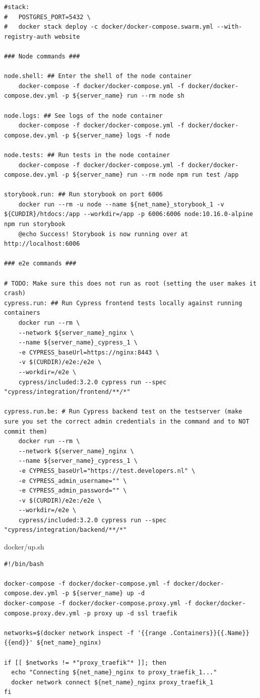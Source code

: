 \begin{verbatim}
#stack:
#	POSTGRES_PORT=5432 \
#	docker stack deploy -c docker/docker-compose.swarm.yml --with-registry-auth website

### Node commands ###

node.shell: ## Enter the shell of the node container
	docker-compose -f docker/docker-compose.yml -f docker/docker-compose.dev.yml -p ${server_name} run --rm node sh

node.logs: ## See logs of the node container
	docker-compose -f docker/docker-compose.yml -f docker/docker-compose.dev.yml -p ${server_name} logs -f node

node.tests: ## Run tests in the node container
	docker-compose -f docker/docker-compose.yml -f docker/docker-compose.dev.yml -p ${server_name} run --rm node npm run test /app

storybook.run: ## Run storybook on port 6006
	docker run --rm -u node --name ${net_name}_storybook_1 -v ${CURDIR}/htdocs:/app --workdir=/app -p 6006:6006 node:10.16.0-alpine npm run storybook
	@echo Success! Storybook is now running over at http://localhost:6006

### e2e commands ###

# TODO: Make sure this does not run as root (setting the user makes it crash)
cypress.run: ## Run Cypress frontend tests locally against running containers
	docker run --rm \
	--network ${server_name}_nginx \
	--name ${server_name}_cypress_1 \
	-e CYPRESS_baseUrl=https://nginx:8443 \
	-v $(CURDIR)/e2e:/e2e \
	--workdir=/e2e \
	cypress/included:3.2.0 cypress run --spec "cypress/integration/frontend/**/*"

cypress.run.be: # Run Cypress backend test on the testserver (make sure you set the correct admin credentials in the command and to NOT commit them)
	docker run --rm \
	--network ${server_name}_nginx \
	--name ${server_name}_cypress_1 \
	-e CYPRESS_baseUrl="https://test.developers.nl" \
	-e CYPRESS_admin_username="" \
	-e CYPRESS_admin_password="" \
	-v $(CURDIR)/e2e:/e2e \
	--workdir=/e2e \
	cypress/included:3.2.0 cypress run --spec "cypress/integration/backend/**/*"
\end{verbatim}

docker/up.sh
\begin{verbatim}
#!/bin/bash

docker-compose -f docker/docker-compose.yml -f docker/docker-compose.dev.yml -p ${server_name} up -d
docker-compose -f docker/docker-compose.proxy.yml -f docker/docker-compose.proxy.dev.yml -p proxy up -d ssl traefik

networks=$(docker network inspect -f '{{range .Containers}}{{.Name}}{{end}}' ${net_name}_nginx)

if [[ $networks != *"proxy_traefik"* ]]; then
  echo "Connecting ${net_name}_nginx to proxy_traefik_1..."
  docker network connect ${net_name}_nginx proxy_traefik_1
fi
\end{verbatim}

